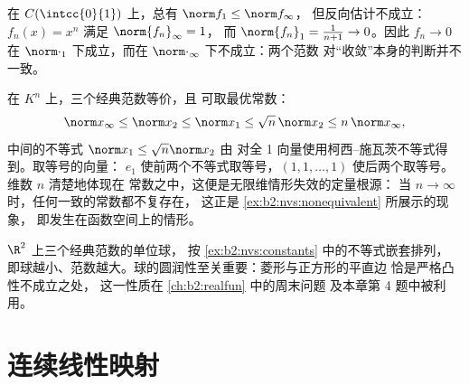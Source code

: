 \begin{example}[无限维中的不等价]\label{ex:b2:nvs:nonequivalent}
在 $C(\intcc{0}{1})$ 上，总有 $\norm f_1 \leq \norm f_\infty$，
但反向估计不成立：$f_n(x) = x^n$ 满足 $\norm{f_n}_\infty = 1$，
而 $\norm{f_n}_1 = \frac{1}{n+1} \to 0$。因此 $f_n \to 0$
在 $\norm\cdot_1$ 下成立，而在 $\norm\cdot_\infty$ 下不成立：两个范数
对“收敛”本身的判断并不一致。
\end{example}

\begin{example}[$n$ 维中的显式常数]\label{ex:b2:nvs:constants}
在 $K^n$ 上，三个经典范数等价，且
可取最优常数：
\[
\norm x_\infty \leq \norm x_2 \leq \norm x_1
\leq \sqrt n\,\norm x_2 \leq n\,\norm x_\infty ,
\]
中间的不等式 $\norm x_1 \leq \sqrt n\norm x_2$ 由
对全 1 向量使用柯西–施瓦茨不等式得到。取等号的向量：
$e_1$ 使前两个不等式取等号，$(1, 1,
\dots, 1)$ 使后两个取等号。维数 $n$ 清楚地体现在
常数之中，这便是无限维情形失效的定量根源：
当 $n \to \infty$ 时，任何一致的常数都不复存在，
这正是 \cref{ex:b2:nvs:nonequivalent} 所展示的现象，
即发生在函数空间上的情形。
\end{example}

\begin{omfigure}

{\small $\R^2$ 上三个经典范数的单位球，
按 \cref{ex:b2:nvs:constants} 中的不等式嵌套排列，
即球越小、范数越大。球的圆润性至关重要：菱形与正方形的平直边
恰是严格凸性不成立之处，
这一性质在 \cref{ch:b2:realfun} 中的周末问题
及本章第 4 题中被利用。}
\end{omfigure}

\section{连续线性映射}

